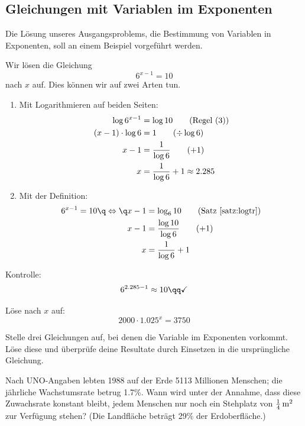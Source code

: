 \documentclass[%
11pt,%
twoside,%
titlepage,%
german,%
headsepline%
]{scrartcl}
\begin{document}
\subsection{Gleichungen mit Variablen im Exponenten}
Die Lösung unseres Ausgangsproblems, die
Bestimmung von Variablen in Exponenten, soll an einem Beispiel
vorgeführt werden.
\begin{bsp}
  Wir lösen die Gleichung $$6^{x-1}=10$$ nach $x$ auf. Dies können
  wir auf zwei Arten tun.
  \begin{enumerate}
    \item Mit Logarithmieren auf beiden Seiten:
    \begin{align}
      \log{6^{x-1}}&=\log{10} \tag{Regel (3)}\\
      (x-1)\cdot\log{6}&= 1 \tag{$\div\log{6}$}\\
      x-1 &= \frac{1}{\log{6}} \tag{$+1$}\\
      x &= \frac{1}{\log{6}} + 1 \approx 2.285 \notag
    \end{align}
    \item Mit der Definition:
    \begin{align}
      6^{x-1}=10\q \Leftrightarrow\q x-1 &= \log_6{10} \tag{Satz \ref{satz:logtr}}\\
      x-1 &= \frac{\log{10}}{\log{6}} \tag{$+1$}\\
      x &= \frac{1}{\log{6}} + 1 \notag
    \end{align}
  \end{enumerate}
  Kontrolle: $$6^{2.285-1} \approx 10 \qq \checkmark$$
\end{bsp}

\begin{ueb}
  Löse nach $x$ auf: $$2000\cdot1.025^x = 3750$$
\end{ueb}

\begin{ueb}[Homework]
  Stelle drei Gleichungen auf, bei denen die Variable im
  Exponenten vorkommt. Löse diese und überprüfe deine Resultate durch
  Einsetzen in die ursprüngliche Gleichung.
\end{ueb}

\begin{ueb}[Weltbevölkerung]
Nach UNO-Angaben lebten 1988 auf der Erde 5113 Millionen Menschen; die jährliche Wachstumsrate betrug 1.7\%. Wann wird unter der Annahme, dass diese Zuwachsrate konstant bleibt, jedem Menschen nur noch ein Stehplatz von $\unit[\frac{1}{4}]{m^2}$ zur Verfügung stehen? (Die Landfläche beträgt 29\% der Erdoberfläche.)
\end{ueb}
\end{document}
